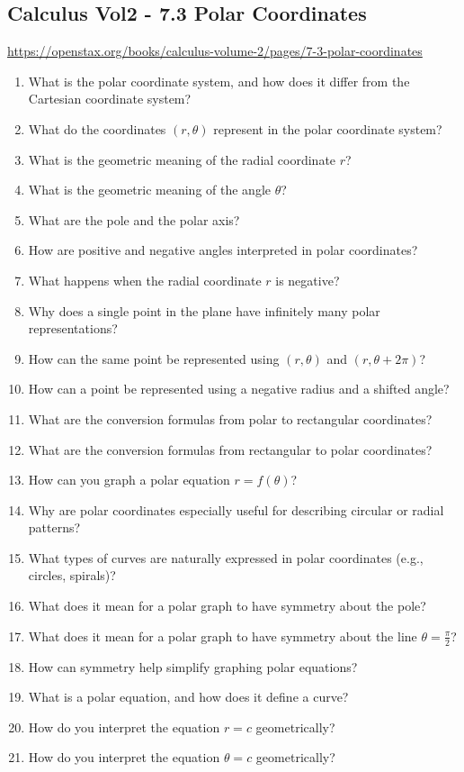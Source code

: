 \subsection{Calculus Vol2 - 7.3 Polar Coordinates}

\url{https://openstax.org/books/calculus-volume-2/pages/7-3-polar-coordinates}

\begin{enumerate}
  \item What is the polar coordinate system, and how does it differ from the Cartesian coordinate system?
  \item What do the coordinates \((r,\theta)\) represent in the polar coordinate system?
  \item What is the geometric meaning of the radial coordinate \(r\)?
  \item What is the geometric meaning of the angle \(\theta\)?
  \item What are the pole and the polar axis?
  \item How are positive and negative angles interpreted in polar coordinates?
  \item What happens when the radial coordinate \(r\) is negative?
  \item Why does a single point in the plane have infinitely many polar representations?
  \item How can the same point be represented using \((r,\theta)\) and \((r,\theta + 2\pi)\)?
  \item How can a point be represented using a negative radius and a shifted angle?
  \item What are the conversion formulas from polar to rectangular coordinates?
  \item What are the conversion formulas from rectangular to polar coordinates?
  \item How can you graph a polar equation \(r = f(\theta)\)?
  \item Why are polar coordinates especially useful for describing circular or radial patterns?
  \item What types of curves are naturally expressed in polar coordinates (e.g., circles, spirals)?
  \item What does it mean for a polar graph to have symmetry about the pole?
  \item What does it mean for a polar graph to have symmetry about the line \(\theta = \frac{\pi}{2}\)?
  \item How can symmetry help simplify graphing polar equations?
  \item What is a polar equation, and how does it define a curve?
  \item How do you interpret the equation \(r = c\) geometrically?
  \item How do you interpret the equation \(\theta = c\) geometrically?
\end{enumerate}
